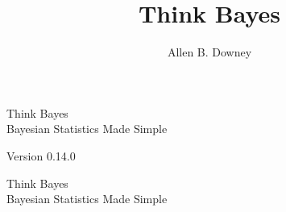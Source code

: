 \documentclass[12pt]{book}
\title{Think Bayes}
\author{Allen B. Downey}
\newcommand{\theversion}{0.14.0}
\newif\ifplastex
\begin{document}
\frontmatter

\ifplastex

\else
\fi

\newcommand{\PMF}{\mathrm{PMF}}
\newcommand{\PDF}{\mathrm{PDF}}
\newcommand{\CDF}{\mathrm{CDF}}
\newcommand{\ICDF}{\mathrm{ICDF}}

\ifplastex
    \usepackage{localdef}
    \maketitle

\else



\begin{latexonly}

\renewcommand{\blankpage}{\thispagestyle{empty} \quad \newpage}


\thispagestyle{empty}

\begin{flushright}
\vspace*{2.0in}

\begin{spacing}{3}
{\huge Think Bayes}\\
{\Large Bayesian Statistics Made Simple}
\end{spacing}

\vspace{0.25in}

Version \theversion

\vfill

\end{flushright}


\blankpage
\blankpage

\pagebreak
\thispagestyle{empty}

\begin{flushright}
\vspace*{2.0in}

\begin{spacing}{3}
{\huge Think Bayes}\\
{\Large Bayesian Statistics Made Simple}
\end{spacing}

\vspace{0.25in}


\end{flushright}
\end{latexonly}
\end{document}
